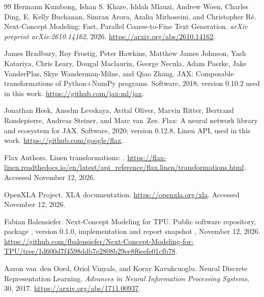 \begingroup
\raggedright
\begin{thebibliography}{99}
Hermann Kumbong, Ishan S. Khare, Iddah Mlauzi, Andrew Woen, Charles Ding,
E. Kelly Buchanan, Simran Arora, Azalia Mirhoseini, and Christopher R\'e.
\newblock Next-Concept Modeling: Fast, Parallel Coarse-to-Fine Text Generation.
\newblock \emph{arXiv preprint arXiv:2610.14162}, 2026.
\newblock \url{https://arxiv.org/abs/2610.14162}.

James Bradbury, Roy Frostig, Peter Hawkins, Matthew James Johnson,
Yash Katariya, Chris Leary, Dougal Maclaurin, George Necula, Adam Paszke,
Jake VanderPlas, Skye Wanderman-Milne, and Qiao Zhang.
\newblock JAX: Composable transformations of Python+NumPy programs.
\newblock Software, 2018; version 0.10.2 used in this work.
\newblock \url{https://github.com/jax-ml/jax}.

Jonathan Heek, Anselm Levskaya, Avital Oliver, Marvin Ritter,
Bertrand Rondepierre, Andreas Steiner, and Marc van~Zee.
\newblock Flax: A neural network library and ecosystem for JAX.
\newblock Software, 2020; version 0.12.8, Linen API, used in this work.
\newblock \url{https://github.com/google/flax}.

Flax Authors.
\newblock Linen transformations: .
\newblock \url{https://flax-linen.readthedocs.io/en/latest/api_reference/flax.linen/transformations.html}.
Accessed November 12, 2026.

OpenXLA Project.
\newblock XLA documentation.
\newblock \url{https://openxla.org/xla}. Accessed November 12, 2026.

Fabian Balensiefer.
\newblock Next-Concept Modeling for TPU.
\newblock Public software repository, package , version 0.1.0,
implementation and report snapshot , November 12, 2026.
\newblock \url{https://github.com/fbalensiefer/Next-Concept-Modeling-for-TPU/tree/1d600d7f4598ddb7e2808b29ee8f6eefe01cfb78}.

Aaron van~den Oord, Oriol Vinyals, and Koray Kavukcuoglu.
\newblock Neural Discrete Representation Learning.
\newblock \emph{Advances in Neural Information Processing Systems}, 30, 2017.
\newblock \url{https://arxiv.org/abs/1711.00937}.


\end{thebibliography}

